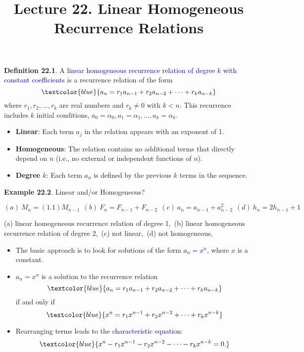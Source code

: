 \documentclass[aspectratio=169]{beamer}
\title{Lecture 22. Linear Homogeneous Recurrence Relations}
\date{ }
\providecommand{\Blue}[1]{\textcolor{blue}{#1}}
\begin{document}
\frame[plain]{\titlepage}



\begin{frame}[plain]{}

 {\bf  Definition 22.1}. A \Blue{linear homogeneous recurrence relation
   of degree $k$ with constant coefficients} is a recurrence relation of the form 
   \[ \Blue{a_n = r_1a_{n-1} + r_{2}a_{n-2}+\cdots + r_ka_{n-k} } 
   \]
   where $r_1, r_2, ..., r_k$ are real numbers and $r_k\neq 0$ with $k<n$. 
   This recurrence includes $k$ initial conditions, 
   $a_0 = \alpha_0, a_1 = \alpha_1,..., a_k = \alpha_k$. \pause
   \begin{itemize}
     \item {\bf Linear}: Each term $a_j$ in the relation appears with an exponent of 1.\pause
     \item {\bf Homogeneous}: The relation contains no additional terms that directly 
     depend on $n$  (i.e., no external or independent functions of $n$). \pause
     \item {\bf Degree $k$}: Each term $a_n$ is defined by the previous $k$ terms in the sequence. \pause
   \end{itemize}
 
 {\bf Example 22.2}. Linear and/or Homogeneous?
 {\small
  \[ (a)\ M_n = (1.1)M_{n-1}\ \ (b)\ F_n = F_{n-1} + F_{n-2} \ \ 
     (c)\ a_n = a_{n-1}+a_{n-2}^2\ \ 
      (d)\ h_n = 2h_{n-1}+1\ \  
  \] 
  
  \pause
  
  (a) linear homogeneous recurrence relation of degree 1,\
  (b) linear homogeneous recurrence relation of degree 2,\
  (c) not linear,\
  (d) not homogeneous,\
  }
  
\end{frame}

\begin{frame}[plain]{}

\begin{itemize}
  \item The basic approach is to look for solutions of the form
       \Blue{$a_n = x^n$}, where $x$ is a constant. \pause
  \item  $a_n = x^n$ is a solution to the recurrence relation
      \[ \Blue{a_n = r_1a_{n-1} + r_{2}a_{n-2}+\cdots + r_ka_{n-k} } 
   \]
   if and only if \pause
    \[ \Blue{x^n = r_1x^{n-1} + r_{2}x^{n-2}+\cdots + r_kx^{n-k} } 
   \]
   \pause
  \item Rearranging terms leads to the \Blue{characteristic equation}:
    \[ \Blue{x^n - r_1x^{n-1} - r_{2}x^{n-2} - \cdots - r_kx^{n-k} = 0. } 
   \]
\end{itemize}
\end{frame}
\end{document}
